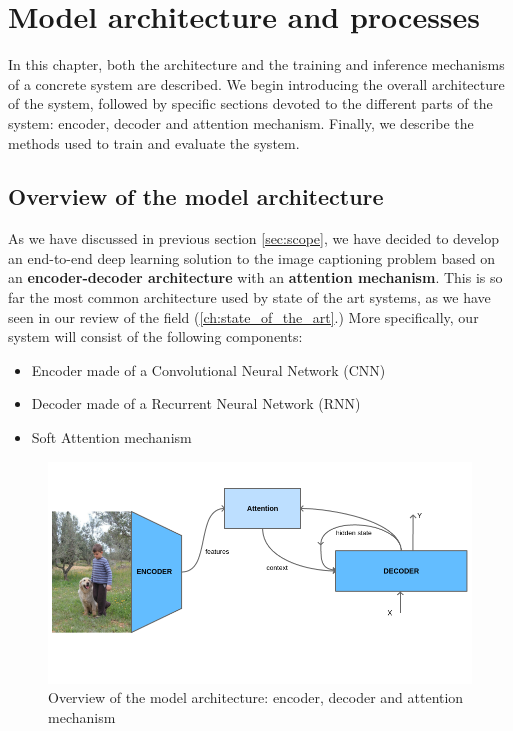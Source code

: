 \chapter{Model architecture and processes}
\label{ch:design}

In this chapter, both the architecture and the training and inference mechanisms of a concrete system are described. We begin introducing the overall architecture of the system, followed by specific sections devoted to the different parts of the system: encoder, decoder and attention mechanism. Finally, we describe the methods used to train and evaluate the system.

\section{Overview of the model architecture}

As we have discussed in previous section \cref{sec:scope}, we have decided to develop an end-to-end deep learning solution to the image captioning problem based on an \textbf{encoder-decoder architecture} with an \textbf{attention mechanism}. This is so far the most common architecture used by state of the art systems, as we have seen in our review of the field (\cref{ch:state_of_the_art}.) More specifically, our system will consist of the following components:

\begin{itemize}
    \item Encoder made of a Convolutional Neural Network (CNN)
    \item Decoder made of a Recurrent Neural Network (RNN)
    \item Soft Attention mechanism
\end{itemize}

\begin{figure}[hpt]
	\centering
	\includegraphics[scale=0.5]{images/ch4/overview.png}
	\caption{Overview of the model architecture: encoder, decoder and attention mechanism}
	\label{fig:overview}
\end{figure}

